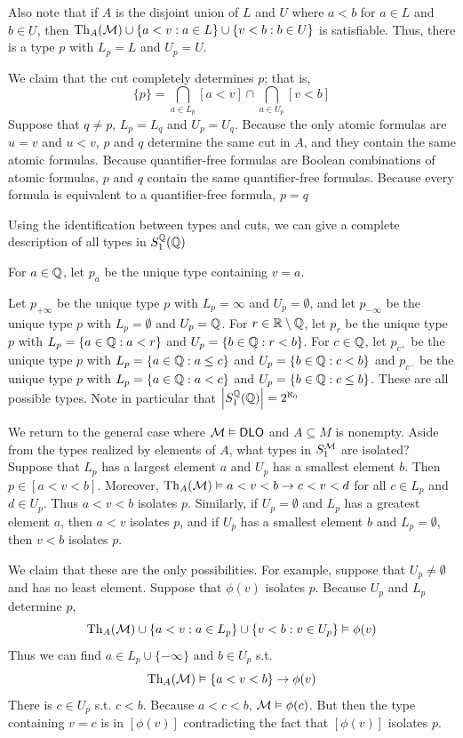 \documentclass[11pt]{article}
\begin{document}
Also note that if \(A\) is the disjoint union of \(L\) and \(U\) where \(a<b\) for \(a\in L\)
and \(b\in U\), then \(\operatorname{Th}_A(\mathcal{M})\cup\{a<v:a\in L\}\cup\{v<b:b\in U\}\) is satisfiable. Thus, there is a
type \(p\) with \(L_p=L\) and \(U_p=U\).

We claim that the cut completely determines \(p\); that is,
\begin{equation*}
\{p\}=\bigcap_{a\in L_p}[a<v]\cap\bigcap_{a\in U_p}[v<b]
\end{equation*}
Suppose that \(q\neq p\), \(L_p=L_q\) and \(U_p=U_q\). Because the only atomic formulas are \(u=v\)
and \(u<v\), \(p\) and \(q\) determine the same cut in \(A\), and they contain the same atomic
formulas. Because quantifier-free formulas are Boolean combinations of atomic formulas, \(p\)
and \(q\) contain the same quantifier-free formulas. Because every formula is equivalent to a
quantifier-free formula, \(p=q\)

Using the identification between types and cuts, we can give a complete description of all types
in \(S_1^{\mathbb{Q}}(\mathbb{Q})\)

For \(a\in\mathbb{Q}\), let \(p_a\) be the unique type containing \(v=a\).

Let \(p_{+\infty}\) be the unique type \(p\) with \(L_p=\infty\) and \(U_p=\emptyset\), and let \(p_{-\infty}\) be the
unique type \(p\) with \(L_p=\emptyset\) and \(U_p=\mathbb{Q}\). For \(r\in\mathbb{R}\setminus\mathbb{Q}\), let \(p_r\) be the unique
type \(p\) with \(L_p=\{a\in\mathbb{Q}:a<r\}\) and \(U_p=\{b\in\mathbb{Q}:r<b\}\). For \(c\in\mathbb{Q}\), let \(p_{c^+}\) be the
unique type \(p\) with \(L_p=\{a\in\mathbb{Q}:a\le c\}\) and \(U_p=\{b\in\mathbb{Q}:c<b\}\) and \(p_{c^-}\) be the unique
type \(p\) with \(L_p=\{a\in\mathbb{Q}:a<c\}\) and \(U_p=\{b\in\mathbb{Q}:c\le b\}\). These are all possible types. Note in
particular that \(\abs{S_1^{\Q}(\Q)}=2^{\aleph_0}\)

We return to the general case where \(\mathcal{M}\vDash\operatorname{\textsf{DLO}}\) and \(A\subseteq M\) is nonempty. Aside from the types
realized by elements of \(A\), what types in \(S_1^{\mathcal{M}}\) are isolated? Suppose that \(L_p\) has a
largest element \(a\) and \(U_p\) has a smallest element \(b\). Then \(p\in[a<v<b]\).
Moreover, \(\operatorname{Th}_A(\mathcal{M})\vDash a<v<b\to c<v<d\) for all \(c\in L_p\) and \(d\in U_p\). Thus \(a<v<b\)
isolates \(p\). Similarly, if \(U_p=\emptyset\) and \(L_p\) has a greatest element \(a\), then \(a<v\)
isolates \(p\), and if \(U_p\) has a smallest element \(b\) and \(L_p=\emptyset\), then \(v<b\)
isolates \(p\).

We claim that these are the only possibilities. For example, suppose that \(U_p\neq\emptyset\) and has no
least element. Suppose that \(\phi(v)\) isolates \(p\). Because \(U_p\) and \(L_p\)
determine \(p\),
\begin{equation*}
\operatorname{Th}_A(\mathcal{M})\cup\{a<v:a\in L_p\}\cup\{v<b:v\in U_p\}\vDash\phi(v)
\end{equation*}
Thus we can find \(a\in L_p\cup\{-\infty\}\) and \(b\in U_p\) s.t.
\begin{equation*}
\operatorname{Th}_A(\mathcal{M})\vDash\{a<v<b\}\to\phi(v)
\end{equation*}
There is \(c\in U_p\) s.t. \(c<b\). Because \(a<c<b\), \(\mathcal{M}\vDash\phi(c)\). But then the type
containing \(v=c\) is in \([\phi(v)]\) contradicting the fact that \([\phi(v)]\) isolates \(p\).
\end{document}

